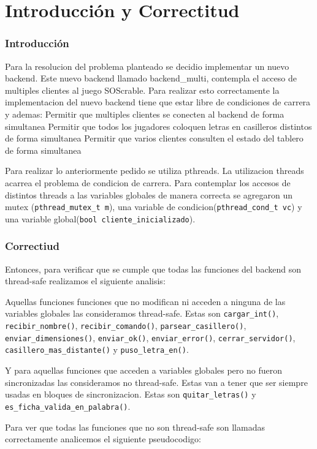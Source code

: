 \part{Introducci\'on y Correctitud}

\section{Introducci\'on}

Para la resolucion del problema planteado se decidio implementar un nuevo backend. Este nuevo backend llamado backend_multi, contempla el acceso de multiples clientes al juego SOScrable. Para realizar esto correctamente la implementacion del nuevo backend tiene que estar libre de condiciones de carrera y ademas:
Permitir que multiples clientes se conecten al backend de forma simultanea
Permitir que todos los jugadores coloquen letras en casilleros distintos de forma simultanea
Permitir que varios clientes consulten el estado del tablero de forma simultanea 

Para realizar lo anteriormente pedido se utiliza pthreads. La utilizacion threads acarrea el problema de condicion de carrera. Para contemplar los accesos de distintos threads a las variables globales de manera correcta se agregaron un mutex (\verb|pthread_mutex_t m|), una variable de condicion(\verb|pthread_cond_t vc|) y una variable global(\verb|bool cliente_inicializado|).

\section{Correctiud}

Entonces, para verificar que se cumple que todas las funciones del backend son thread-safe realizamos el siguiente analisis:

Aquellas funciones funciones que no modifican ni acceden a ninguna de las variables globales las consideramos thread-safe. Estas son \verb|cargar_int()|, \verb|recibir_nombre()|, \verb|recibir_comando()|, \verb|parsear_casillero()|, \verb|enviar_dimensiones()|, \verb|enviar_ok()|, \verb|enviar_error()|, \verb|cerrar_servidor()|, \verb|casillero_mas_distante()| y \verb|puso_letra_en()|.

Y para aquellas funciones que acceden a variables globales pero no fueron sincronizadas las consideramos no thread-safe. Estas van a tener que ser siempre usadas en bloques de sincronizacion. Estas son \verb|quitar_letras()| y \verb|es_ficha_valida_en_palabra()|.

Para ver que todas las funciones que no son thread-safe son llamadas correctamente analicemos el siguiente pseudocodigo:
